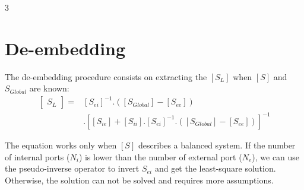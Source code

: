 \documentclass[final]{beamer}
\begin{document}
\begin{frame}[t]
\begin{multicols}{3}

      \section{De-embedding}
      The de-embedding procedure consists on extracting the $[S_L]$ when $[S]$ and $S_{Global}$ are known:
      \begin{equation*}
         \begin{aligned}
            \begin{bmatrix}
               S_L
            \end{bmatrix}
            = & {[S_{ei}]}^{-1}.([S_{Global}]-[S_{ee}])                                          \\
              & .{\left[{[S_{ie}]+[S_{ii}].{[S_{ei}]}^{-1}.([S_{Global}]-[S_{ee}])}\right]}^{-1}
         \end{aligned}
         \label{de-emb}
      \end{equation*}

      The equation works only when $[S]$ describes a balanced system. If the number of internal ports ($N_i$) is lower than the number of external port ($N_e$), we can use the pseudo-inverse operator to invert $S_{ei}$ and get the least-square solution. Otherwise, the solution can not be solved and requires more assumptions.



\end{multicols}
\end{frame}
\end{document}
